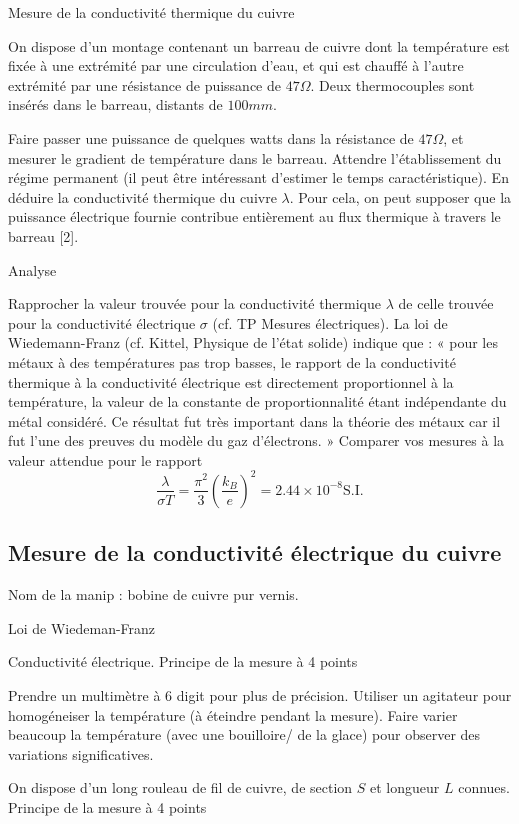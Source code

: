 \documentclass{article}%
\begin{document}
Mesure de la conductivité thermique du cuivre

On dispose d'un montage contenant un barreau de cuivre dont la température est fixée à une extrémité par une circulation d'eau, et qui est chauffé à l'autre extrémité par une résistance de puissance de $47 \Omega$. Deux thermocouples sont insérés dans le barreau, distants de $100 mm$.

Faire passer une puissance de quelques watts dans la résistance de $47 \Omega$, et mesurer le gradient de température dans le barreau. Attendre l'établissement du régime permanent (il peut être intéressant d'estimer le temps caractéristique). En déduire la conductivité thermique du cuivre $\lambda$. Pour cela, on peut supposer que la puissance électrique fournie contribue entièrement au flux thermique à travers le barreau [2].

Analyse 

Rapprocher la valeur trouvée pour la conductivité thermique $\lambda$ de celle trouvée pour la conductivité électrique $\sigma$ (cf. TP Mesures électriques). La loi de Wiedemann-Franz (cf. Kittel, Physique de l'état solide) indique que : « pour les métaux à des températures pas trop basses, le rapport de la conductivité thermique à la conductivité électrique est directement proportionnel à la température, la valeur de la constante de proportionnalité étant indépendante du métal considéré. Ce résultat fut très important dans la théorie des métaux car il fut l'une des preuves du modèle du gaz d'électrons. » Comparer vos mesures à la valeur attendue pour le rapport
\[\frac{\lambda}{\sigma T} = \frac{\pi^2}{3}\left(\frac{k_B}{e}\right)^2 = 2.44\times 10^{-8}  \mathrm{S.I.}\]


\subsection{Mesure de la conductivité électrique du cuivre}

Nom de la manip : bobine de cuivre pur vernis.

Loi de Wiedeman-Franz

Conductivité électrique. Principe de la mesure à 4 points

Prendre un multimètre à 6 digit pour plus de précision. Utiliser un agitateur pour homogéneiser la température (à éteindre pendant la mesure). Faire varier beaucoup la température (avec une bouilloire/ de la glace) pour observer des variations significatives.

On dispose d'un long rouleau de fil de cuivre, de section $ S$ et longueur $L$ connues.
Principe de la mesure à 4 points
\end{document}
